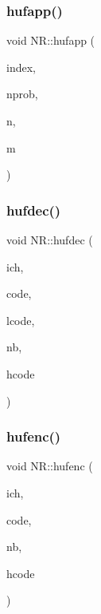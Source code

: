 \subsubsection{\texorpdfstring{hufapp()}{hufapp()}}
{\footnotesize\ttfamily void N\+R\+::hufapp (\begin{DoxyParamCaption}\item[{\mbox{\hyperlink{namespaceNR_a3b5de5b305729eeca6289dfee2a39229}{Vec\+\_\+\+I\+O\+\_\+\+U\+L\+NG}} \&}]{index,  }\item[{\mbox{\hyperlink{namespaceNR_a117570729decc729db86f7655e7a23e5}{Vec\+\_\+\+I\+\_\+\+U\+L\+NG}} \&}]{nprob,  }\item[{const unsigned long}]{n,  }\item[{const unsigned long}]{m }\end{DoxyParamCaption})}

\mbox{\label{namespaceNR_a2b3c3380b58a2d4cbf0c61f8bd444aec}} 
\subsubsection{\texorpdfstring{hufdec()}{hufdec()}}
{\footnotesize\ttfamily void N\+R\+::hufdec (\begin{DoxyParamCaption}\item[{unsigned long \&}]{ich,  }\item[{std\+::string \&}]{code,  }\item[{const unsigned long}]{lcode,  }\item[{unsigned long \&}]{nb,  }\item[{\mbox{\hyperlink{classNR_1_1huffcode}{huffcode}} \&}]{hcode }\end{DoxyParamCaption})}

\mbox{\label{namespaceNR_af74ccd5e55d8850e189e33cc374a6c5b}} 
\subsubsection{\texorpdfstring{hufenc()}{hufenc()}}
{\footnotesize\ttfamily void N\+R\+::hufenc (\begin{DoxyParamCaption}\item[{const unsigned long}]{ich,  }\item[{std\+::string \&}]{code,  }\item[{unsigned long \&}]{nb,  }\item[{\mbox{\hyperlink{classNR_1_1huffcode}{huffcode}} \&}]{hcode }\end{DoxyParamCaption})}

